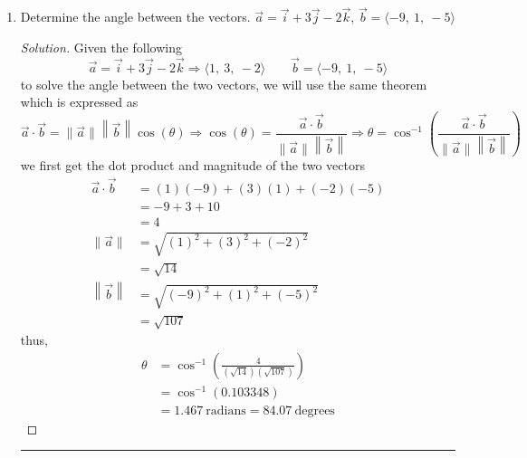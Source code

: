\documentclass[12pt]{article}
\begin{document}
\begin{enumerate}
			\item[5.)] Determine the angle between the vectors. \(\vec{a} = \vec{i} + 3\vec{j}-2\vec{k}\), \(\vec{b} = \langle -9,~1,~-5\rangle\)
				\begin{proof}[Solution]
					Given the following 
					\[\vec{a} = \vec{i} + 3\vec{j} -2\vec{k}\Rightarrow \langle 1,~3,~-2\rangle \qquad \vec{b} = \langle -9,~1,~-5\rangle\]
					to solve the angle between the two vectors, we will use the same theorem which is expressed as
					\[\vec{a}\cdot\vec{b} = \|\vec{a}\|\left\|\vec{b}\right\|\cos\left(\theta\right) \Longrightarrow \cos\left(\theta\right) = \frac{\vec{a}\cdot\vec{b}}{\|\vec{a}\|\left\|\vec{b}\right\|} \Longrightarrow \theta = \cos^{-1}\left(\frac{\vec{a}\cdot\vec{b}}{\|\vec{a}\|\left\|\vec{b}\right\|}\right)\]
					we first get the dot product and magnitude of the two vectors
					\begin{align*}
						\vec{a}\cdot\vec{b} & = \left(1\right)\left(-9\right)+\left(3\right)\left(1\right)+\left(-2\right)\left(-5\right) \\
						& = -9+3+10 \\
						& = 4 \\
						\|\vec{a}\| & = \sqrt{\left(1\right)^2+\left(3\right)^2+\left(-2\right)^2} \\
						& = \sqrt{14} \\
						\left\|\vec{b}\right\| & = \sqrt{\left(-9\right)^2+\left(1\right)^2+\left(-5\right)^2} \\
						& = \sqrt{107}
					\end{align*}
					thus,
					\begin{align*}
						\theta & = \cos^{-1} \left(\frac{4}{\left(\sqrt{14}\right)\left(\sqrt{107}\right)}\right) \\
						& = \cos^{-1} \left(0.103348\right) \\
						& = 1.467~\text{radians} = 84.07~\text{degrees}
					\end{align*}
				\end{proof}
				\hrule
			

\end{enumerate}
\end{document}
